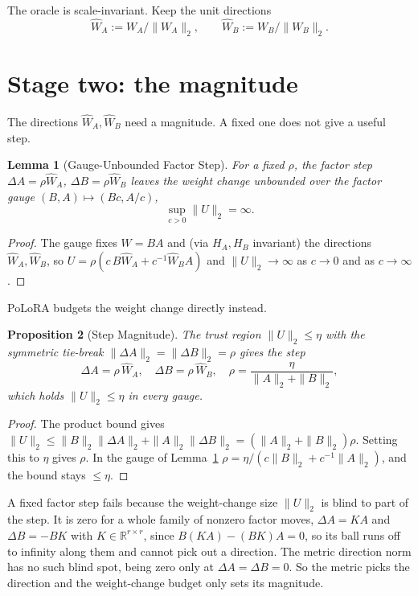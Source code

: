 \documentclass[11pt]{article}
\DeclarePairedDelimiter{\norm}{\lVert}{\rVert}
\newcommand{\R}{\mathbb{R}}
\newcommand{\norm}[1]{\| #1\|}
\newtheorem{proposition}{Proposition}
\newtheorem{lemma}[proposition]{Lemma}
\begin{document}
The oracle is scale-invariant. Keep the unit directions
\[
  \widehat W_A:=W_A/\norm{W_A}_2,\qquad \widehat W_B:=W_B/\norm{W_B}_2.
\]

\section{Stage two: the magnitude}
\label{sec:magnitude}

The directions $\widehat W_A,\widehat W_B$ need a magnitude. A fixed one does not
give a useful step.

\begin{lemma}[Gauge-Unbounded Factor Step]
\label{lem:gauge}
For a fixed $\rho$, the factor step $\Delta A=\rho\widehat W_A$,
$\Delta B=\rho\widehat W_B$ leaves the weight change unbounded over the factor
gauge $(B,A)\mapsto(Bc,A/c)$,
\begin{equation}
  \sup_{c>0}\norm{U}_2=\infty .
  \label{eq:gauge-sup}
\end{equation}
\end{lemma}

\begin{proof}
The gauge fixes $W=BA$ and (via $H_A,H_B$ invariant) the directions
$\widehat W_A,\widehat W_B$, so $U=\rho(c\,B\widehat W_A+c^{-1}\widehat W_B A)$ and
$\norm{U}_2\to\infty$ as $c\to0$ and as $c\to\infty$.
\end{proof}

PoLoRA budgets the weight change directly instead.

\begin{proposition}[Step Magnitude]
\label{prop:length}
The trust region $\norm{U}_2\le\eta$ with the symmetric tie-break
$\norm{\Delta A}_2=\norm{\Delta B}_2=\rho$ gives the step
\begin{equation}
  \Delta A=\rho\,\widehat W_A,\quad
  \Delta B=\rho\,\widehat W_B,\quad
  \rho=\frac{\eta}{\norm{A}_2+\norm{B}_2},
  \label{eq:step}
\end{equation}
which holds $\norm{U}_2\le\eta$ in every gauge.
\end{proposition}

\begin{proof}
The product bound gives
$\norm{U}_2\le\norm{B}_2\norm{\Delta A}_2+\norm{A}_2\norm{\Delta B}_2=(\norm{A}_2+\norm{B}_2)\rho$.
Setting this to $\eta$ gives $\rho$. In the gauge of Lemma~\ref{lem:gauge}
$\rho=\eta/(c\norm{B}_2+c^{-1}\norm{A}_2)$, and the bound stays $\le\eta$.
\end{proof}

A fixed factor step fails because the weight-change size $\norm{U}_2$ is blind to
part of the step. It is zero for a whole family of nonzero factor moves,
$\Delta A=KA$ and $\Delta B=-BK$ with $K\in\R^{r\times r}$, since
$B(KA)-(BK)A=0$, so its ball runs off to infinity along them and cannot pick out a
direction. The metric direction norm has no such blind spot, being zero only at
$\Delta A=\Delta B=0$. So the metric picks the direction and the weight-change
budget only sets its magnitude.
\end{document}
